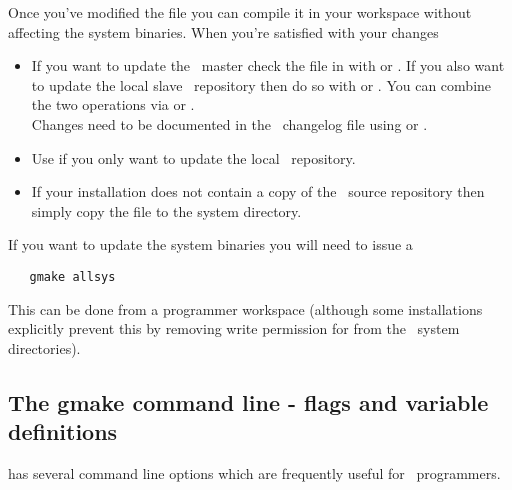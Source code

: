 \noindent
Once you've modified the file you can compile it in your workspace without
affecting the system binaries.  When you're satisfied with your changes

\begin{itemize}
\item
   If you want to update the \aipspp\ master check the file in with
    or .  If you also want to update the local slave
   \rcs\ repository then do so with  or .  You can
   combine the two operations via  or .
   \\Changes need to be documented in the \aipspp\ changelog file using
    or .

\item
   Use  if you only want to update the local \rcs\ repository.

\item
   If your installation does not contain a copy of the \rcs\ source repository
   then simply copy the file to the system directory.
\end{itemize}

\noindent
If you want to update the system binaries you will need to issue a

\begin{verbatim}
   gmake allsys
\end{verbatim}

\noindent
This can be done from a programmer workspace (although some installations
explicitly prevent this by removing write permission for  from
the \aipspp\ system directories).

\subsection*{The gmake command line - flags and variable definitions}

 has several command line options which are frequently useful
for \aipspp\ programmers.

